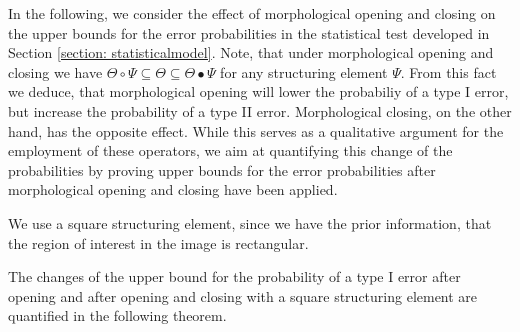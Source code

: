 \documentclass[a4paper,12pt]{article}
\theoremstyle{plain}
\theoremstyle{definition}
\begin{document}
In the following, we consider the effect of morphological opening and closing on the upper bounds for the error probabilities in the statistical test developed in Section \ref{section: statisticalmodel}. Note, that under morphological opening and closing we have $\Theta \circ \Psi \subseteq \Theta \subseteq \Theta \bullet \Psi$ for any structuring element $\Psi$. From this fact we deduce, that morphological opening will lower the probabiliy of a type I error, but increase the probability of a type II error. Morphological closing, on the other hand, has the opposite effect. While this serves as a qualitative argument for the employment of these operators, we aim at quantifying this change of the probabilities by proving upper bounds for the error probabilities after morphological opening and closing have been applied.

We use a square structuring element, since we have the prior information, that the region of interest in the image is rectangular.

The changes of the upper bound for the probability of a type I error after opening and after opening and closing with a square structuring element are quantified in the following theorem.
\end{document}
